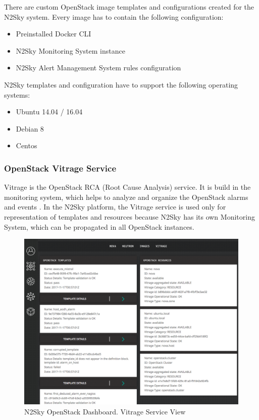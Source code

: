 There are custom OpenStack image templates and configurations created for the N2Sky system. Every image has to contain the following configuration:
\begin{itemize}
\item Preinstalled Docker CLI
\item N2Sky Monitoring System instance
\item N2Sky Alert Management System rules configuration
\end{itemize}

N2Sky templates and configuration have to support the following operating systems:
\begin{itemize}
\item Ubuntu 14.04 / 16.04 
\item Debian 8
\item Centos
\end{itemize}



\subsubsection{OpenStack Vitrage Service}\label{OpenStack Vitrage Service}

Vitrage is the OpenStack RCA (Root Cause Analysis) service. It is build in the monitoring system, which helps to analyze and organize the OpenStack alarms and events \cite{wiki:vitrage}. In the N2Sky platform, the Vitrage service is used only for representation of templates and resources because N2Sky has its own Monitoring System, which can be propagated in all OpenStack instances.  

\begin{figure}[H]
\begin{center}
  \includegraphics[width=\linewidth]{components/4/pics/opentack_vitrage.png}
  \caption{N2Sky OpenStack Dashboard. Vitrage Service View}
  \label{fig:opentack_vitrage}
\end{center}
\end{figure}

